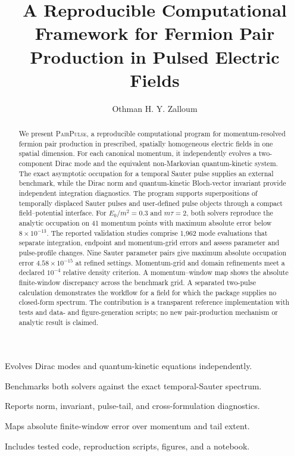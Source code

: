 \documentclass[a4paper,fleqn]{cas-dc}
\newcommand{\PairPulse}{\textsc{PairPulse}}
\begin{document}
\let\WriteBookmarks\relax
\def\floatpagepagefraction{1}
\def\textpagefraction{.001}

\title [mode = title]{A Reproducible Computational Framework for Fermion Pair Production in Pulsed Electric Fields}

\author[1]{Othman H. Y. Zalloum}
\cormark[1]

\begin{abstract}
We present \PairPulse, a reproducible computational program for momentum-resolved fermion pair production in prescribed, spatially homogeneous electric fields in one spatial dimension. For each canonical momentum, it independently evolves a two-component Dirac mode and the equivalent non-Markovian quantum-kinetic system. The exact asymptotic occupation for a temporal Sauter pulse supplies an external benchmark, while the Dirac norm and quantum-kinetic Bloch-vector invariant provide independent integration diagnostics. The program supports superpositions of temporally displaced Sauter pulses and user-defined pulse objects through a compact field--potential interface. For $E_0/m^2=0.3$ and $m\tau=2$, both solvers reproduce the analytic occupation on 41 momentum points with maximum absolute error below $8\times10^{-13}$. The reported validation studies comprise 1,962 mode evaluations that separate integration, endpoint and momentum-grid errors and assess parameter and pulse-profile changes. Nine Sauter parameter pairs give maximum absolute occupation error $4.58\times10^{-15}$ at refined settings. Momentum-grid and domain refinements meet a declared $10^{-4}$ relative density criterion. A momentum--window map shows the absolute finite-window discrepancy across the benchmark grid. A separated two-pulse calculation demonstrates the workflow for a field for which the package supplies no closed-form spectrum. The contribution is a transparent reference implementation with tests and data- and figure-generation scripts; no new pair-production mechanism or analytic result is claimed.
\end{abstract}

\begin{highlights}
\item Evolves Dirac modes and quantum-kinetic equations independently.
\item Benchmarks both solvers against the exact temporal-Sauter spectrum.
\item Reports norm, invariant, pulse-tail, and cross-formulation diagnostics.
\item Maps absolute finite-window error over momentum and tail extent.
\item Includes tested code, reproduction scripts, figures, and a notebook.
\end{highlights}
\end{document}
